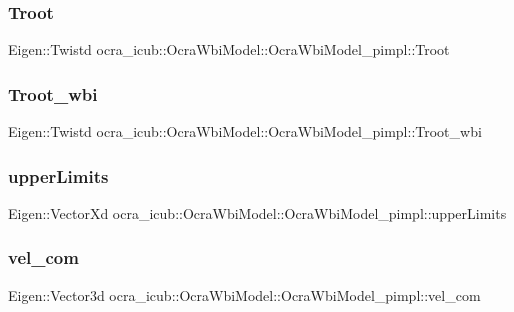\subsubsection{\texorpdfstring{Troot}{Troot}}
{\footnotesize\ttfamily Eigen\+::\+Twistd ocra\+\_\+icub\+::\+Ocra\+Wbi\+Model\+::\+Ocra\+Wbi\+Model\+\_\+pimpl\+::\+Troot}

\hypertarget{structOcraWbiModel_1_1OcraWbiModel__pimpl_acd5e52a21301d36f453dd9a43fc6f50b}{}\label{structOcraWbiModel_1_1OcraWbiModel__pimpl_acd5e52a21301d36f453dd9a43fc6f50b} 
\subsubsection{\texorpdfstring{Troot\+\_\+wbi}{Troot\_wbi}}
{\footnotesize\ttfamily Eigen\+::\+Twistd ocra\+\_\+icub\+::\+Ocra\+Wbi\+Model\+::\+Ocra\+Wbi\+Model\+\_\+pimpl\+::\+Troot\+\_\+wbi}

\hypertarget{structOcraWbiModel_1_1OcraWbiModel__pimpl_a632b9a37d054a1dc6fcf6403e52e62e7}{}\label{structOcraWbiModel_1_1OcraWbiModel__pimpl_a632b9a37d054a1dc6fcf6403e52e62e7} 
\subsubsection{\texorpdfstring{upper\+Limits}{upperLimits}}
{\footnotesize\ttfamily Eigen\+::\+Vector\+Xd ocra\+\_\+icub\+::\+Ocra\+Wbi\+Model\+::\+Ocra\+Wbi\+Model\+\_\+pimpl\+::upper\+Limits}

\hypertarget{structOcraWbiModel_1_1OcraWbiModel__pimpl_a96c3cdb51b2a2b69c0738605c30e1b2e}{}\label{structOcraWbiModel_1_1OcraWbiModel__pimpl_a96c3cdb51b2a2b69c0738605c30e1b2e} 
\subsubsection{\texorpdfstring{vel\+\_\+com}{vel\_com}}
{\footnotesize\ttfamily Eigen\+::\+Vector3d ocra\+\_\+icub\+::\+Ocra\+Wbi\+Model\+::\+Ocra\+Wbi\+Model\+\_\+pimpl\+::vel\+\_\+com}

